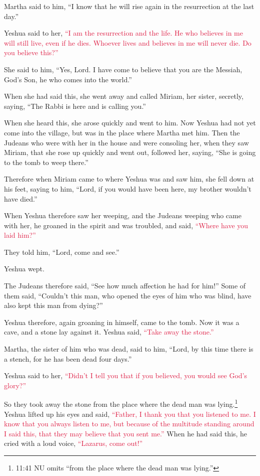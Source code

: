 \myverse{}Martha said to him, “I know that he will rise again in the resurrection
at the last day.”

\myverse{}Yeshua said to her, \textcolor{crimson}{“I am the resurrection and the life. He who believes in me will still live, even if he dies.} \myverse{}\textcolor{crimson}{Whoever lives and believes in me will never die. Do you believe this?”}

\myverse{}She said to him, “Yes, Lord. I have come to believe that you
are the Messiah, God’s Son, he who comes into the world.”

\myverse{}When she had said this, she went away and called Miriam, her
sister, secretly, saying, “The Rabbi is here and is calling you.”

\myverse{}When she heard this, she arose quickly and went to him.
\myverse{}Now Yeshua had not yet come into the village, but was in the place where
Martha met him.
\myverse{}Then the Judeans who were with her in the house and were consoling her, when
they saw Miriam, that she rose up quickly and went out, followed her, saying, “She is going to the tomb
to weep there.”

\myverse{}Therefore when Miriam came to where Yeshua was and saw him,
she fell down at his feet, saying to him, “Lord, if you would have been here, my brother wouldn’t have
died.”

\myverse{}When Yeshua therefore saw her weeping, and the Judeans weeping
who came with her, he groaned in the spirit and was troubled,
\myverse{}and said,
\textcolor{crimson}{“Where have you laid him?”}

They told him, “Lord, come and see.”

\myverse{}Yeshua wept.

\myverse{}The Judeans therefore said, “See how much affection he had for
him!”
\myverse{}Some of them said, “Couldn’t this man, who opened the eyes of him who was
blind, have also kept this man from dying?”

\myverse{}Yeshua therefore, again groaning in himself, came to the tomb.
Now it was a cave, and a stone lay against it.
\myverse{}Yeshua said,
\textcolor{crimson}{“Take away the stone.”}

Martha, the sister of him who was dead, said to him, “Lord, by this time there is a stench,
for he has been dead four days.”

\myverse{}Yeshua said to her,
\textcolor{crimson}{“Didn’t I tell you that if you believed, you would see God’s glory?”}

\myverse{}So they took away the stone from the place where the dead man
was lying.\footnote{11:41 NU omits “from the place where the dead man was lying.”} Yeshua lifted up his eyes and
said,
\textcolor{crimson}{“Father, I thank you that you listened to me.
}
\myverse{}\textcolor{crimson}{I know that you always listen to me, but because of the multitude standing
	around I said this, that they may believe that you sent me.”
}
\myverse{}When he had said this, he cried with a loud voice,
\textcolor{crimson}{“Lazarus, come out!”}


